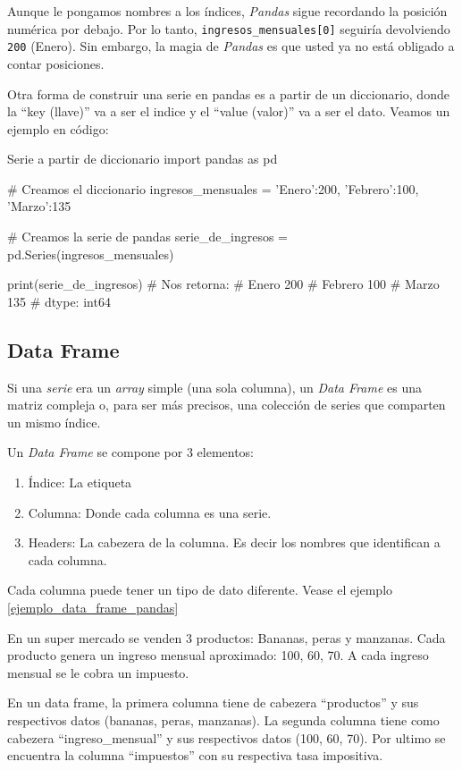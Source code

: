 \begin{nota}
    Aunque le pongamos nombres a los índices, \textit{Pandas} sigue recordando la posición numérica por debajo. Por lo tanto, \texttt{ingresos\_mensuales[0]} seguiría devolviendo \texttt{200} (Enero). Sin embargo, la magia de \textit{Pandas} es que usted ya no está obligado a contar posiciones.
\end{nota}

Otra forma de construir una serie en pandas es a partir de un diccionario, donde la ``key (llave)'' va a ser el indice y el ``value (valor)'' va a ser el dato. Veamos un ejemplo en código:
\begin{pycode}{Serie a partir de diccionario}
import pandas as pd

# Creamos el diccionario
ingresos_mensuales = {
    'Enero':200, 'Febrero':100, 'Marzo':135
}

# Creamos la serie de pandas
serie_de_ingresos = pd.Series(ingresos_mensuales)

print(serie_de_ingresos) # Nos retorna:
# Enero      200
# Febrero    100
# Marzo      135
# dtype: int64
\end{pycode}

\subsection{Data Frame}

Si una \textit{serie} era un \textit{array} simple (una sola columna), un \textit{Data Frame} es una matriz compleja o, para ser más precisos, una colección de series que comparten un mismo índice.

Un \textit{Data Frame} se compone por 3 elementos:
\begin{enumerate}
    \item Índice: La etiqueta 
    \item Columna: Donde cada columna es una serie.
    \item Headers: La cabezera de la columna. Es decir los nombres que identifican a cada columna.
\end{enumerate}

Cada columna puede tener un tipo de dato diferente. Vease el ejemplo \ref{ejemplo_data_frame_pandas}

\begin{ejemplo}
    \label{ejemplo_data_frame_pandas}
    En un super mercado se venden 3 productos: Bananas, peras y manzanas. Cada producto genera un ingreso mensual aproximado: 100, 60, 70. A cada ingreso mensual se le cobra un impuesto. 
    
    En un data frame, la primera columna tiene de cabezera ``productos'' y sus respectivos datos (bananas, peras, manzanas). La segunda columna tiene como cabezera ``ingreso\_mensual'' y sus respectivos datos (100, 60, 70). Por ultimo se encuentra la columna ``impuestos'' con su respectiva tasa impositiva.
\end{ejemplo}

